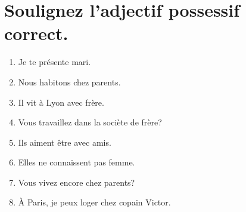\section{Soulignez l'adjectif possessif correct.}

\begin{enumerate}
    \item Je te présente  mari.
    \item Nous habitons chez  parents.
    \item Il vit à Lyon avec  frère.
    \item Vous travaillez dans la sociète de  frère?
    \item Ils aiment être avec  amis.
    \item Elles ne connaissent pas  femme.
    \item Vous vivez encore chez  parents?
    \item À Paris, je peux loger chez  copain Victor.
\end{enumerate}